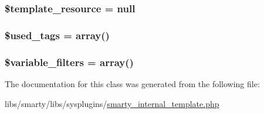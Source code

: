 \subsubsection[{\$template\+\_\+resource}]{\setlength{\rightskip}{0pt plus 5cm}\$template\+\_\+resource = null}\label{class_smarty___internal___template_a93dbc9fc2973c09e307929d7cce4dff3}
\hypertarget{class_smarty___internal___template_a724bb7a42f1d86f6844534ac644ac210}{}
\subsubsection[{\$used\+\_\+tags}]{\setlength{\rightskip}{0pt plus 5cm}\$used\+\_\+tags = array()}\label{class_smarty___internal___template_a724bb7a42f1d86f6844534ac644ac210}
\hypertarget{class_smarty___internal___template_a52837a08ed9b9dfab552bd427c231c88}{}
\subsubsection[{\$variable\+\_\+filters}]{\setlength{\rightskip}{0pt plus 5cm}\$variable\+\_\+filters = array()}\label{class_smarty___internal___template_a52837a08ed9b9dfab552bd427c231c88}


The documentation for this class was generated from the following file\+:\begin{DoxyCompactItemize}
\item 
libs/smarty/libs/sysplugins/\hyperlink{smarty__internal__template_8php}{smarty\+\_\+internal\+\_\+template.\+php}\end{DoxyCompactItemize}
